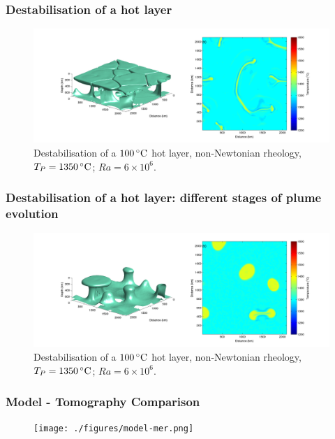 \documentclass[aspectratio=169]{beamer}
\begin{document}
\begin{frame}
    \frametitle{Destabilisation of a hot layer}
    \begin{figure}
        \vspace{-.5cm}
        \includegraphics[width=0.85\paperwidth]{./figures/100hot/100hotbase_7.png}
        \caption{Destabilisation of a $100\rm\,^{\circ}C$ hot layer, non-Newtonian rheology, $T_{P}=1350\rm\,^{\circ}C$; $Ra = 6\times10^{6}$.}
    \end{figure}
\end{frame}

\begin{frame}
    \frametitle{Destabilisation of a hot layer: different stages of plume evolution}
    \begin{figure}
        \vspace{-.5cm}
        \includegraphics[width=0.85\paperwidth]{./figures/100hot/100hotbase_3.png}
        \caption{Destabilisation of a $100\rm\,^{\circ}C$ hot layer, non-Newtonian rheology, $T_{P}=1350\rm\,^{\circ}C$; $Ra = 6\times10^{6}$.}
    \end{figure}
\end{frame}

\begin{frame}
    \frametitle{Model - Tomography Comparison}
    \begin{figure}
        \vspace{-0.5cm}
        \texttt{[image: ./figures/model-mer.png]}
    \end{figure}
\end{frame}
\end{document}
